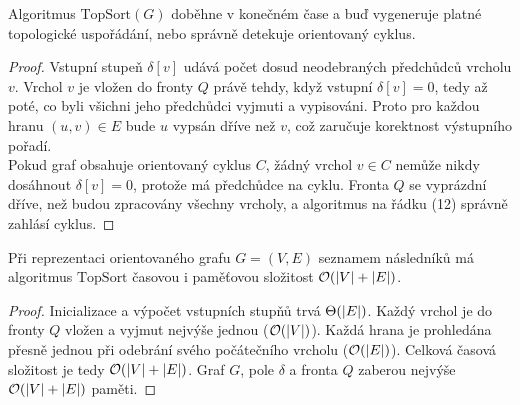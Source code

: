 \bigskip

\begin{theorem}
Algoritmus $\text{TopSort}(G)$ doběhne v konečném čase a buď vygeneruje platné topologické uspořádání, nebo správně detekuje orientovaný cyklus.
\end{theorem}

\medskip

\begin{proof}
Vstupní stupeň $\delta[v]$ udává počet dosud neodebraných předchůdců vrcholu $v$.
Vrchol $v$ je vložen do fronty $Q$ právě tehdy, když vstupní $\delta[v] = 0$, tedy až poté, co byli všichni jeho předchůdci vyjmuti a vypisováni. Proto pro každou hranu $(u, v) \in E$ bude $u$ vypsán dříve než $v$, což zaručuje korektnost výstupního pořadí. \\
Pokud graf obsahuje orientovaný cyklus $C$, žádný vrchol $v \in C$ nemůže nikdy dosáhnout $\delta[v] = 0$, protože má předchůdce na cyklu. Fronta $Q$ se vyprázdní dříve, než budou zpracovány všechny vrcholy, a algoritmus na řádku (12) správně zahlásí cyklus.
\end{proof} \bigskip

\begin{theorem}
Při reprezentaci orientovaného grafu $G = (V, E)$ seznamem následníků má algoritmus $\text{TopSort}$ časovou i paměťovou složitost $\mathcal{O}(|V| + |E|)$.
\end{theorem}

\begin{proof}
Inicializace a výpočet vstupních stupňů trvá $\Theta(|E|)$. Každý vrchol je do fronty $Q$ vložen a vyjmut nejvýše jednou ($\mathcal{O}(|V|)$). Každá hrana je prohledána přesně jednou při odebrání svého počátečního vrcholu ($\mathcal{O}(|E|)$). Celková časová složitost je tedy $\mathcal{O}(|V| + |E|)$. Graf $G$, pole $\delta$ a fronta $Q$ zaberou nejvýše $\mathcal{O}(|V| + |E|)$ paměti.
\end{proof}
